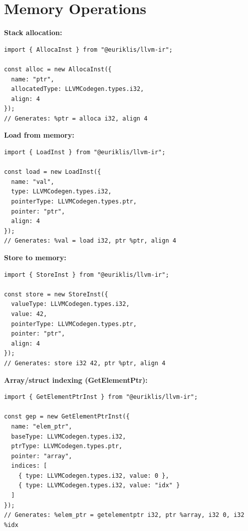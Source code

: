 \section{Memory Operations}

\textbf{Stack allocation:}
\begin{lstlisting}[style=ts]
import { AllocaInst } from "@euriklis/llvm-ir";

const alloc = new AllocaInst({
  name: "ptr",
  allocatedType: LLVMCodegen.types.i32,
  align: 4
});
// Generates: %ptr = alloca i32, align 4
\end{lstlisting}

\textbf{Load from memory:}
\begin{lstlisting}[style=ts]
import { LoadInst } from "@euriklis/llvm-ir";

const load = new LoadInst({
  name: "val",
  type: LLVMCodegen.types.i32,
  pointerType: LLVMCodegen.types.ptr,
  pointer: "ptr",
  align: 4
});
// Generates: %val = load i32, ptr %ptr, align 4
\end{lstlisting}

\textbf{Store to memory:}
\begin{lstlisting}[style=ts]
import { StoreInst } from "@euriklis/llvm-ir";

const store = new StoreInst({
  valueType: LLVMCodegen.types.i32,
  value: 42,
  pointerType: LLVMCodegen.types.ptr,
  pointer: "ptr",
  align: 4
});
// Generates: store i32 42, ptr %ptr, align 4
\end{lstlisting}

\textbf{Array/struct indexing (GetElementPtr):}
\begin{lstlisting}[style=ts]
import { GetElementPtrInst } from "@euriklis/llvm-ir";

const gep = new GetElementPtrInst({
  name: "elem_ptr",
  baseType: LLVMCodegen.types.i32,
  ptrType: LLVMCodegen.types.ptr,
  pointer: "array",
  indices: [
    { type: LLVMCodegen.types.i32, value: 0 },
    { type: LLVMCodegen.types.i32, value: "idx" }
  ]
});
// Generates: %elem_ptr = getelementptr i32, ptr %array, i32 0, i32 %idx
\end{lstlisting}

